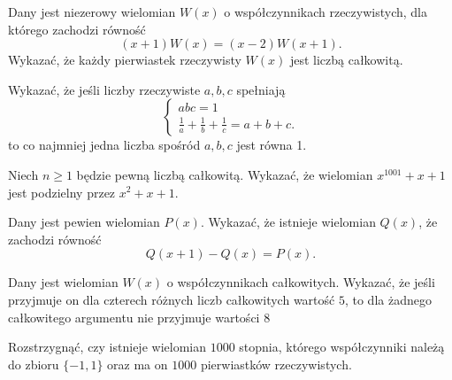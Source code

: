 \begin{problem}{1}
	Dany jest niezerowy wielomian $W(x)$ o współczynnikach rzeczywistych, dla którego zachodzi równość
	\[
		(x + 1)W(x) = (x - 2)W(x + 1).
	\]
	Wykazać, że każdy pierwiastek rzeczywisty $W(x)$ jest liczbą całkowitą.
\end{problem}


\begin{problem}{2}
	Wykazać, że jeśli liczby rzeczywiste $a, b, c$ spełniają
    \[
    \begin{cases}
        abc = 1 \\
        \frac{1}{a} + \frac{1}{b} + \frac{1}{c} = a + b + c.
    \end{cases}
    \]
    to co najmniej jedna liczba spośród $a, b, c$ jest równa 1.
\end{problem}

\begin{problem}{3}
	Niech $n \geqslant 1$ będzie pewną liczbą całkowitą. Wykazać, że wielomian $x^{1001} + x + 1$ jest podzielny przez $x^2 + x + 1$.
\end{problem}


\begin{problem}{4}
	Dany jest pewien wielomian $P(x)$. Wykazać, że istnieje wielomian $Q(x)$, że zachodzi równość
	\[
		Q(x + 1) - Q(x) = P(x).
	\]
\end{problem}

\begin{problem}{5}
	Dany jest wielomian $W(x)$ o współczynnikach całkowitych. Wykazać, że jeśli przyjmuje on dla czterech różnych liczb całkowitych wartość $5$, to dla żadnego całkowitego argumentu nie przyjmuje wartości $8$
\end{problem}

\begin{problem}{7}
	Rozstrzygnąć, czy istnieje wielomian $1000$ stopnia, którego współczynniki należą do zbioru $\{-1, 1\}$ oraz ma on $1000$ pierwiastków rzeczywistych.
\end{problem}

